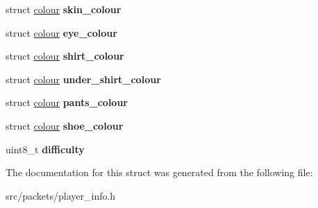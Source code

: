 \begin{DoxyCompactItemize}
\item 
\hypertarget{structplayer__info_a07c0f5def70b4166e096ddcd3a97ca38}{}struct \hyperlink{structcolour}{colour} {\bfseries skin\+\_\+colour}\label{structplayer__info_a07c0f5def70b4166e096ddcd3a97ca38}

\item 
\hypertarget{structplayer__info_a0bc30b4098d9e738128dc994c14c93b8}{}struct \hyperlink{structcolour}{colour} {\bfseries eye\+\_\+colour}\label{structplayer__info_a0bc30b4098d9e738128dc994c14c93b8}

\item 
\hypertarget{structplayer__info_a493dc14702dbc8a0dbc5f7b019ea212b}{}struct \hyperlink{structcolour}{colour} {\bfseries shirt\+\_\+colour}\label{structplayer__info_a493dc14702dbc8a0dbc5f7b019ea212b}

\item 
\hypertarget{structplayer__info_a1fdc2ce79b3674830dc8e730fbf6d5d5}{}struct \hyperlink{structcolour}{colour} {\bfseries under\+\_\+shirt\+\_\+colour}\label{structplayer__info_a1fdc2ce79b3674830dc8e730fbf6d5d5}

\item 
\hypertarget{structplayer__info_ab9f721411f121d5185564d0ba4010ed5}{}struct \hyperlink{structcolour}{colour} {\bfseries pants\+\_\+colour}\label{structplayer__info_ab9f721411f121d5185564d0ba4010ed5}

\item 
\hypertarget{structplayer__info_a25fb71a212c35ba2f98574b73c45e073}{}struct \hyperlink{structcolour}{colour} {\bfseries shoe\+\_\+colour}\label{structplayer__info_a25fb71a212c35ba2f98574b73c45e073}

\item 
\hypertarget{structplayer__info_ae7c592b3676f5216cf153200cd6d4fcd}{}uint8\+\_\+t {\bfseries difficulty}\label{structplayer__info_ae7c592b3676f5216cf153200cd6d4fcd}

\end{DoxyCompactItemize}


The documentation for this struct was generated from the following file\+:\begin{DoxyCompactItemize}
\item 
src/packets/player\+\_\+info.\+h\end{DoxyCompactItemize}
